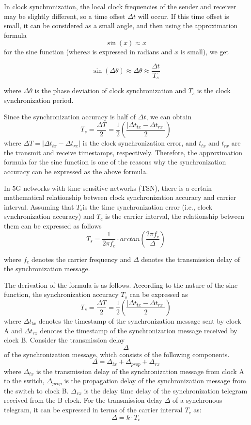 \documentclass[english]{cccconf}
\begin{document}
In clock synchronization, the local clock frequencies of the sender and receiver may be slightly different, so a time offset $\Delta t$ will occur. If this time offset is small, it can be considered as a small angle, and then using the approximation formula $$\sin(x) \approx x$$ for the sine function (where$x$ is expressed in radians and $x$ is small), we get

$$\sin(\Delta\theta) \approx \Delta\theta \approx \frac{\Delta t}{T_s}$$

where $\Delta\theta$ is the phase deviation of clock synchronization and $T_s$ is the clock synchronization period.

Since the synchronization accuracy is half of $\Delta t$, we can obtain
$$T_s = \frac{\Delta T}{2} = \frac{1}{2}\left(\frac{|\Delta t_{tx} - \Delta t_{rx}|}{2}\right)$$
where $\Delta T = |\Delta t_{tx} - \Delta t_{rx}|$ is the clock synchronization error, and $t_{tx}$ and $t_{rx}$ are the transmit and receive timestamps, respectively.
Therefore, the approximation formula for the sine function is one of the reasons why the synchronization accuracy can be expressed as the above formula.

In 5G networks with time-sensitive networks (TSN), there is a certain mathematical relationship between clock synchronization accuracy and carrier interval. Assuming that $T_s$is the time synchronization error (i.e., clock synchronization accuracy) and $T_c$ is the carrier interval, the relationship between them can be expressed as follows
\begin{equation}
	T_s = \frac{1}{2\pi f_c}\cdot arctan\left(\frac{2\pi f_c}{\Delta}\right)
\end{equation}

where $f_c$ denotes the carrier frequency and $\Delta$ denotes the transmission delay of the synchronization message.

The derivation of the formula is as follows.
According to the nature of the sine function, the synchronization accuracy $T_s$ can be expressed as
\begin{equation}
	T_s = \frac{\Delta T}{2} = \frac{1}{2}\left(\frac{|\Delta t_{tx} - \Delta t_{rx}|}{2}\right)
\end{equation}
where $\Delta t_{tx}$ denotes the timestamp of the synchronization message sent by clock A and $\Delta t_{rx}$ denotes the timestamp of the synchronization message received by clock B.
Consider the transmission delay $$\Delta$$ of the synchronization message, which consists of the following components.
\begin{equation}
	\Delta = \Delta_{tx} + \Delta_{prop} + \Delta_{rx}
\end{equation}
where $\Delta_{tx}$ is the transmission delay of the synchronization message from clock A to the switch, $\Delta_{prop}$ is the propagation delay of the synchronization message from the switch to clock B.
$\Delta_{rx}$ is the delay time delay of the synchronization telegram received from the B clock.
For the transmission delay $\Delta$ of a synchronous telegram, it can be expressed in terms of the carrier interval $T_c$ as:
\begin{equation}
	\Delta = k \cdot T_c 
\end{equation}
\end{document}
